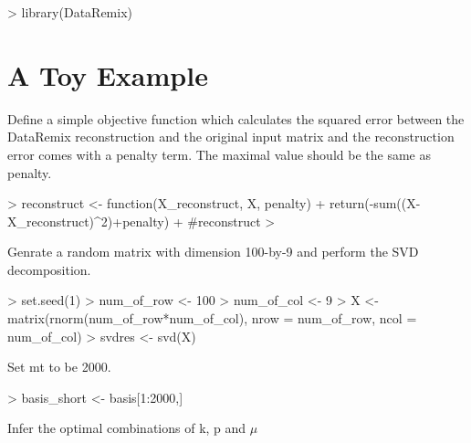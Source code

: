 \documentclass{article}
\begin{document}


\begin{Schunk}
\begin{Sinput}
> library(DataRemix)
\end{Sinput}
\end{Schunk}
\section{A Toy Example}
Define a simple objective function which calculates the squared error between the DataRemix reconstruction and the original input matrix and the reconstruction error comes with a penalty term. The maximal value should be the same as penalty.
\begin{Schunk}
\begin{Sinput}
> reconstruct <- function(X_reconstruct, X, penalty){
+   return(-sum((X-X_reconstruct)^2)+penalty)
+ }#reconstruct
> 
\end{Sinput}
\end{Schunk}
Genrate a random matrix with dimension 100-by-9 and perform the SVD decomposition.
\begin{Schunk}
\begin{Sinput}
> set.seed(1)
> num_of_row <- 100
> num_of_col <- 9
> X <- matrix(rnorm(num_of_row*num_of_col), nrow = num_of_row, ncol = num_of_col)
> svdres <- svd(X)
\end{Sinput}
\end{Schunk}
Set mt to be 2000.
\begin{Schunk}
\begin{Sinput}
> basis_short <- basis[1:2000,]
\end{Sinput}
\end{Schunk}
Infer the optimal combinations of k, p and $\mu$
\end{document}
